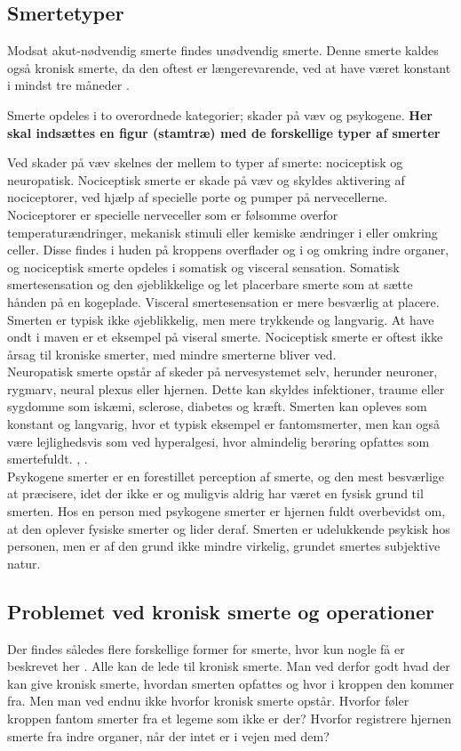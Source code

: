\subsection{Smertetyper}
Modsat akut-nødvendig smerte findes unødvendig smerte. Denne smerte kaldes også kronisk smerte, da den oftest er længerevarende, ved at have været konstant i mindst tre måneder \citep{Giangregorio1997}. 

Smerte opdeles i to overordnede kategorier; skader på væv og psykogene.
\textbf{Her skal indsættes en figur (stamtræ) med de forskellige typer af smerter} 

Ved skader på væv skelnes der mellem to typer af smerte: nociceptisk og neuropatisk. Nociceptisk smerte er skade på væv og skyldes aktivering af nociceptorer, ved hjælp af specielle porte og pumper på nervecellerne. Nociceptorer er specielle nerveceller som er følsomme overfor temperaturændringer, mekanisk stimuli eller kemiske ændringer i eller omkring celler. Disse findes i huden på kroppens overflader og i og omkring indre organer, og nociceptisk smerte opdeles i somatisk og visceral sensation. Somatisk smertesensation og den øjeblikkelige og let placerbare smerte som at sætte hånden på en kogeplade. Visceral smertesensation er mere besværlig at placere. Smerten er typisk ikke øjeblikkelig, men mere trykkende og langvarig. At have ondt i maven er et eksempel på viseral smerte. Nociceptisk smerte er oftest ikke årsag til kroniske smerter, med mindre smerterne bliver ved.\\ 
Neuropatisk smerte opstår af skeder på nervesystemet selv, herunder neuroner, rygmarv, neural plexus eller hjernen. Dette kan skyldes infektioner, traume eller sygdomme som iskæmi, sclerose, diabetes og kræft. Smerten kan opleves som konstant og langvarig, hvor et typisk eksempel er fantomsmerter, men kan også være lejlighedsvis som ved hyperalgesi, hvor almindelig berøring opfattes som smertefuldt. \citep{Giangregorio1997}, \citep{Carmon}.\\
Psykogene smerter er en forestillet perception af smerte, og den mest besværlige at præcisere, idet der ikke er og muligvis aldrig har været en fysisk grund til smerten. Hos en person med psykogene smerter er hjernen fuldt overbevidst om, at den oplever fysiske smerter og lider deraf. Smerten er udelukkende psykisk hos personen, men er af den grund ikke mindre virkelig, grundet smertes subjektive natur. \citep{Giangregorio1997}

\subsection{Problemet ved kronisk smerte og operationer}
Der findes således flere forskellige former for smerte, hvor kun nogle få er beskrevet her \citep{Carmon}. Alle kan de lede til kronisk smerte. Man ved derfor godt hvad der kan give kronisk smerte, hvordan smerten opfattes og hvor i kroppen den kommer fra. Men man ved endnu ikke hvorfor kronisk smerte opstår. Hvorfor føler kroppen fantom smerter fra et legeme som ikke er der? Hvorfor registrere hjernen smerte fra indre organer, når der intet er i vejen med dem? 



